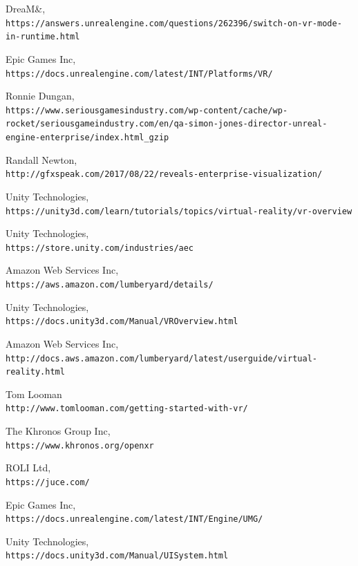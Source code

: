 \documentclass[onecolumn, draftclsnofoot,10pt, compsoc]{IEEEtran}
\begin{document}
\newpage
\begin{thebibliography}{}

DreaM\&\Mer,
\\\texttt{https://answers.unrealengine.com/questions/262396/switch-on-vr-mode-in-runtime.html}

Epic Games Inc,
\\\texttt{https://docs.unrealengine.com/latest/INT/Platforms/VR/}

Ronnie Dungan,
\\\texttt{https://www.seriousgamesindustry.com/wp-content/cache/wp-rocket/seriousgameindustry.com/en/qa-simon-jones-director-unreal-engine-enterprise/index.html_gzip}

Randall Newton,
\\\texttt{http://gfxspeak.com/2017/08/22/reveals-enterprise-visualization/}

Unity Technologies,
\\\texttt{https://unity3d.com/learn/tutorials/topics/virtual-reality/vr-overview}

Unity Technologies,
\\\texttt{https://store.unity.com/industries/aec}

Amazon Web Services Inc,
\\\texttt{https://aws.amazon.com/lumberyard/details/}

Unity Technologies,
\\\texttt{https://docs.unity3d.com/Manual/VROverview.html}

Amazon Web Services Inc,
\\\texttt{http://docs.aws.amazon.com/lumberyard/latest/userguide/virtual-reality.html}

Tom Looman
\\\texttt{http://www.tomlooman.com/getting-started-with-vr/}

The Khronos Group Inc,
\\\texttt{https://www.khronos.org/openxr}

ROLI Ltd,
\\\texttt{https://juce.com/}

Epic Games Inc,
\\\texttt{https://docs.unrealengine.com/latest/INT/Engine/UMG/}

Unity Technologies,
\\\texttt{https://docs.unity3d.com/Manual/UISystem.html}


\end{thebibliography}
\end{document}
